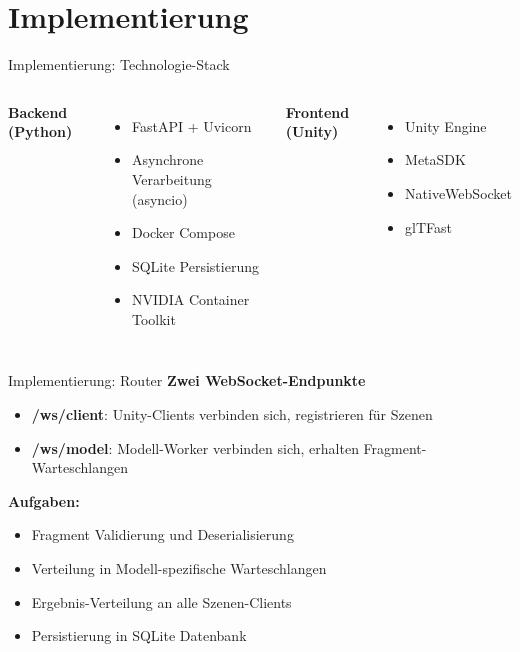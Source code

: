 \section{Implementierung}\sectionFrame

\begin{frame}{Implementierung: Technologie-Stack}{\small\cite{ramirez2023fastapi, NVIDIAContainerToolkitDocs, endel2024nativewebsocket, atteneder2024gltfast, MetaPassthrough2021}}
    \begin{columns}[T]
        \textbf{Backend (Python)}
        \begin{itemize}
            \itemsep0.4em
            \item FastAPI + Uvicorn
            \item Asynchrone Verarbeitung (asyncio)
            \item Docker Compose
            \item SQLite Persistierung
            \item NVIDIA Container Toolkit
        \end{itemize}
        
        \textbf{Frontend (Unity)}
        \begin{itemize}
            \itemsep0.4em
            \item Unity Engine
            \item MetaSDK
            \item NativeWebSocket
            \item glTFast
        \end{itemize}
    \end{columns}
\end{frame}

\begin{frame}{Implementierung: Router}{}
    \textbf{Zwei WebSocket-Endpunkte}
    \begin{itemize}
        \itemsep0.4em
        \item \textbf{/ws/client}: Unity-Clients verbinden sich, registrieren für Szenen
        \item \textbf{/ws/model}: Modell-Worker verbinden sich, erhalten Fragment-Warteschlangen
    \end{itemize}
    
    \vspace{0.8em}
    
    \textbf{Aufgaben:}
    \begin{itemize}
        \itemsep0.4em
        \item Fragment Validierung und Deserialisierung
        \item Verteilung in Modell-spezifische Warteschlangen
        \item Ergebnis-Verteilung an alle Szenen-Clients
        \item Persistierung in SQLite Datenbank
    \end{itemize}
\end{frame}

